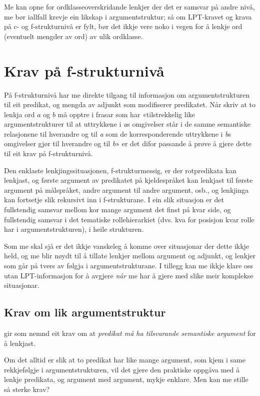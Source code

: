 \documentclass[11pt,a4paper,oneside,draft]{report}
\begin{document}
Me kan opne for ordklasseoverskridande lenkjer der det er samsvar på
andre nivå, me bør iallfall krevje ein likskap i argumentstruktur; så
om LPT-kravet og krava på c- og f-strukturnivå er fylt, bør det ikkje
vere noko i vegen for å lenkje ord (eventuelt mengder av ord) av ulik
ordklasse.


\section{Krav på f-strukturnivå}
\label{sec-3.6}

 
På f-strukturnivå har me direkte tilgang til informasjon om
argumentstrukturen til eit predikat, og mengda av adjunkt som
modifiserer predikatet. Når \citet[s.~3]{thunes2003eal} skriv at to
lenkja ord $a$ og $b$ må opptre i frasar som har «tilstrekkelig like
argumentstrukturer til at uttrykkene i \emph{a}s omgivelser står i de
samme semantiske relasjonene til hverandre og til \emph{a} som de
korresponderende uttrykkene i \emph{b}s omgivelser gjør til hverandre
og til \emph{b}» er det difor passande å prøve å gjere dette til eit
krav på f-strukturnivå.

Den enklaste lenkjingssituasjonen, f-strukturmessig, er der
rotpredikata kan lenkjast, og første argument av predikatet på
kjeldespråket kan lenkjast til første argument på målspråket, andre
argument til andre argument, osb., og lenkjinga kan fortsetje slik
rekursivt inn i f-strukturane. I ein slik situasjon er det fullstendig
samsvar mellom kor mange argument det finst på kvar side, og
fullstendig samsvar i det tematiske rollehierarkiet (dvs. kva for
posisjon kvar rolle har i argumentstrukturen), i heile strukturen.

Som me skal sjå er det ikkje vanskeleg å komme over situasjonar der
dette ikkje held, og me blir nøydt til å tillate lenkjer mellom
argument og adjunkt, og lenkjer som går på tvers av følgja i
argumentstrukturane. I tillegg kan me ikkje klare oss utan
LPT-informasjon for å avgjere \emph{når} me har å gjere med slike meir
komplekse situasjonar. 
\subsection{Krav om lik argumentstruktur}
\label{sec-3.6.1}

\label{SEC:lik-argstr}

\citet{thunes2003eal} gir som nemnd eit krav om at \emph{predikat må ha tilsvarande semantiske argument} for å lenkjast.

Om det alltid er slik at to predikat har like mange argument, som kjem i
same rekkjefølgje i argumentstrukturen, vil det gjere den praktiske
oppgåva med å lenkje predikata, og argument med argument, mykje
enklare. Men kan me stille så sterke krav?
\end{document}
